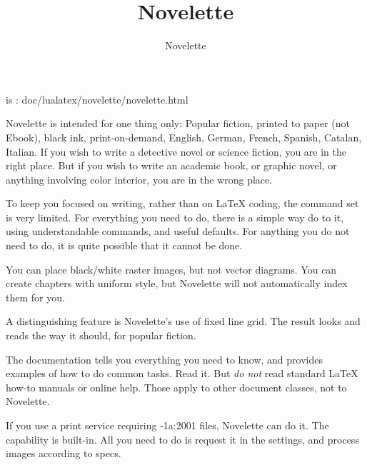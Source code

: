 \documentclass{novelette} %
\title{Novelette}
\author{Novelette}
\begin{document}
\mainmatter
\begin{opening}
\null\null
{}
\null
{}
\null\null
\end{opening}

 is :
doc/lualatex/novelette/novelette.html

Novelette is intended for one thing only: Popular fiction, printed to paper
(not Ebook), black ink, print-on-demand, English, German, French, Spanish,
Catalan, Italian.
If you wish to write a detective novel or science fiction, you are in the
right place. But if you wish to write an academic book, or graphic novel,
or anything involving color interior, you are in the wrong place.

To keep you focused on writing, rather than on LaTeX coding, the command
set is very limited. For everything you need to do, there is a simple
way do to it, using understandable commands, and useful defaults. For anything
you do not need to do, it is quite possible that it cannot be done.

You can place black/white raster images, but not vector diagrams. You can
create chapters with uniform style, but Novelette will not automatically
index them for you.

A distinguishing feature is Novelette's use of fixed line grid. The result
looks and reads the way it should, for popular fiction.

The  documentation tells you everything you need to know,
and provides examples of how to do common tasks. Read it. But \textit{do not}
read standard LaTeX how-to manuals or online help. Those apply to other
document classes, not to Novelette.

If you use a print service requiring -1a:2001 files, Novelette
can do it. The capability is built-in. All you need to do is request it in the
settings, and process images according to specs.
\end{document}
